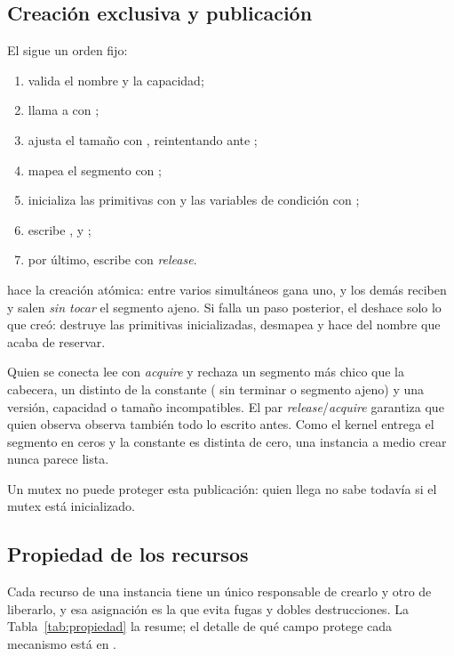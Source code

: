 \subsection{Creación exclusiva y publicación}

El  sigue un orden fijo:
\begin{enumerate}
  \item valida el nombre y la capacidad;
  \item llama a  con ;
  \item ajusta el tamaño con , reintentando ante
  ;
  \item mapea el segmento con ;
  \item inicializa las primitivas con  y las
  variables de condición con ;
  \item escribe ,  y ;
  \item por último, escribe  con \emph{release}.
\end{enumerate}

 hace la creación atómica: entre varios 
simultáneos gana uno, y los demás reciben  y salen
\emph{sin tocar} el segmento ajeno. Si falla un paso posterior, el
 deshace solo lo que creó: destruye las primitivas
inicializadas, desmapea y hace  del nombre que acaba de
reservar.

Quien se conecta lee  con \emph{acquire} y rechaza un
segmento más chico que la cabecera, un  distinto de la
constante ( sin terminar o segmento ajeno) y una versión,
capacidad o tamaño incompatibles. El par \emph{release}/\emph{acquire} garantiza que quien observa
 observa también todo lo escrito antes. Como el kernel entrega
el segmento en ceros y la constante es distinta de cero, una instancia a
medio crear nunca parece lista.

Un mutex no puede proteger esta publicación: quien llega no sabe todavía
si el mutex está inicializado.

\subsection{Propiedad de los recursos}

Cada recurso de una instancia tiene un único responsable de crearlo y
otro de liberarlo, y esa asignación es la que evita fugas y dobles
destrucciones. La Tabla~\ref{tab:propiedad} la resume; el detalle de qué
campo protege cada mecanismo está en .

